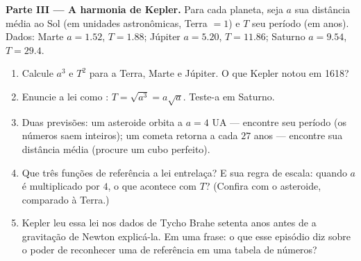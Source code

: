 \begin{problem}
\medskip
\noindent\textbf{Parte III --- A harmonia de Kepler.}
Para cada planeta, seja $a$ sua distância média ao Sol (em
unidades astronômicas, Terra $= 1$) e $T$ seu período (em anos).
Dados: Marte $a = 1.52$, $T = 1.88$; Júpiter $a = 5.20$,
$T = 11.86$; Saturno $a = 9.54$, $T = 29.4$.
\begin{enumerate}[resume]
  \item Calcule $a^3$ e $T^2$ para a Terra, Marte e Júpiter. O
        que Kepler notou em 1618?
  \item Enuncie a lei como : $T = \sqrt{a^3} = a\sqrt a$.
        Teste-a em Saturno.
  \item Duas previsões: um asteroide orbita a $a = 4$ UA ---
        encontre seu período (os números saem inteiros); um
        cometa retorna a cada $27$ anos --- encontre sua
        distância média (procure um cubo perfeito).
  \item Que três funções de referência a lei entrelaça? E sua
        regra de escala: quando $a$ é multiplicado por $4$, o que
        acontece com $T$? (Confira com o asteroide, comparado à
        Terra.)
  \item Kepler leu essa lei nos dados de Tycho Brahe setenta anos
        antes de a gravitação de Newton explicá-la. Em uma frase:
        o que esse episódio diz sobre o poder de reconhecer uma
         de referência em uma tabela de números?
\end{enumerate}


\end{problem}
